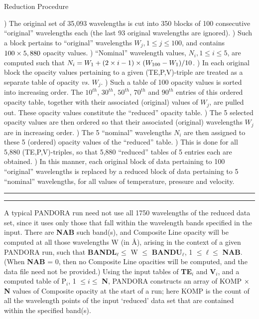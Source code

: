 \centerline{Reduction Procedure}
) The original set of 35,093 wavelengths is cut into 350 blocks of 100
consecutive ``original'' wavelengths each (the last 93 original wavelengths
are ignored). \np
{}) Such a block pertains to ``original'' wavelengths $W_j, 1 \leq j \leq 100$,
and contains $100 \times 5,880$ opacity values. \np
{}) ``Nominal'' wavelength values, $N_i, 1 \leq i \leq 5$, are computed such that
\break $N_i = W_1 + ({2 \times i} - 1) \times (W_{100} - W_1) / 10$. \np
{}) In each original block the opacity values pertaining to a given
(TE,P,V)-triple are treated as a separate table of opacity {\it vs.} $W_j$. \np
{}) Such a table of 100 opacity values is sorted into increasing order. The
$10^{th}$, $30^{th}$, $50^{th}$, $70^{th}$ and $90^{th}$ entries of this
ordered opacity table, together with their associated (original) values
of $W_j$, are pulled out. These opacity values constitute the ``reduced''
opacity table. \np
{}) The 5 selected opacity values are then ordered so that their associated
\break (original) wavelengths $W_j$ are in increasing order. \np
{}) The  5 ``nominal'' wavelengths $N_i$ are then assigned to these 5
(ordered) opacity values of the ``reduced'' table. \np
{}) This is done for all 5,880 (TE,P,V)-triples, so that 5,880 ``reduced''
tables of 5 entries each are obtained. \np
{}) In this manner, each original block of data pertaining to 100
``original'' wavelengths is replaced by a reduced block of data pertaining
to 5 ``nominal'' wavelengths, for all values of temperature, pressure and
velocity. \np
\blankline
\hrule \vskip 1pt \hrule height 1pt
\blankline
\blankline
\blankline
A typical PANDORA run need not use all 1750 wavelengths of the reduced data
set, since it uses only those that fall within the wavelength bands specified
in the input. There are {\bf NAB} such band(s), and Composite Line opacity
will be computed at all those wavelengths W (in \AA), arising in the context of
a given PANDORA run, such that {\bf BANDL}$_\ell \leq$ W $\leq$ 
{\bf BANDU}$_\ell$, 1 $\leq \ell \leq$ {\bf NAB}. (When {\bf NAB} = 0,
then no Composite Line opacities will be computed, and the data file need
not be provided.) Using the input tables of {\bf TE}$_i$ and {\bf V}$_i$,
and a computed table of P$_i$, 1 $\leq i \leq$ {\bf N}, PANDORA constructs an 
array of KOMP $\times$ {\bf N} values of Composite opacity at the start of
a run; here KOMP is the count of all the wavelength points of
the input `reduced' data set that are contained within the specified
band(s).

